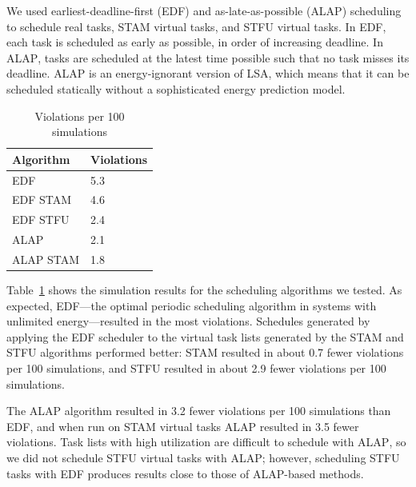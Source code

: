 We used earliest-deadline-first (\textsc{EDF}) and as-late-as-possible (\textsc{ALAP}) scheduling to schedule real tasks, \textsc{STAM} virtual tasks, and \textsc{STFU} virtual tasks.  In \textsc{EDF}, each task is scheduled as early as possible, in order of increasing deadline.  In \textsc{ALAP}, tasks are scheduled at the latest time possible such that no task misses its deadline.  \textsc{ALAP} is an energy-ignorant version of LSA, which means that it can be scheduled statically without a sophisticated energy prediction model.
\begin{table}[h]
\begin{center}
\begin{tabular}{| l | l |}
\hline
\textbf{Algorithm} & \textbf{Violations} \\
\hline
EDF & 5.3 \\
EDF \textsc{STAM} & 4.6 \\
EDF \textsc{STFU} & 2.4 \\
ALAP & 2.1 \\
ALAP \textsc{STAM} & 1.8 \\
\hline
\end{tabular}
\end{center}
\label{tab:simresults}
\caption{Violations per 100 simulations}
\end{table}
Table~\ref{tab:simresults} shows the simulation results for the scheduling algorithms we tested.  As expected, \textsc{EDF}---the optimal periodic scheduling algorithm in systems with unlimited energy---resulted in the most violations.  Schedules generated by applying the \textsc{EDF} scheduler to the virtual task lists generated by the \textsc{STAM} and \textsc{STFU} algorithms performed better: \textsc{STAM} resulted in about 0.7 fewer violations per 100 simulations, and \textsc{STFU} resulted in about 2.9 fewer violations per 100 simulations.

The \textsc{ALAP} algorithm resulted in 3.2 fewer violations per 100 simulations than \textsc{EDF}, and when run on \textsc{STAM} virtual tasks \textsc{ALAP} resulted in 3.5 fewer violations.  Task lists with high utilization are difficult to schedule with \textsc{ALAP}, so we did not schedule \textsc{STFU} virtual tasks with \textsc{ALAP}; however, scheduling \textsc{STFU} tasks with EDF produces results close to those of \textsc{ALAP}-based methods.






































